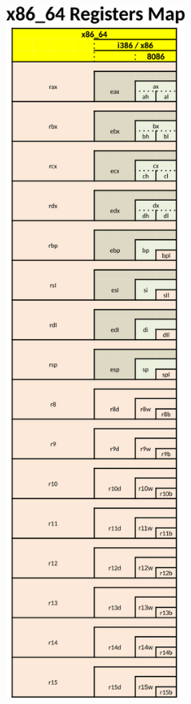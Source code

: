 \documentclass[letterpaper,12pt]{exam}
\begin{document}
\begin{center}
    \includegraphics[height=9in]{../../02_Registers/images/X86_64-GP-registersBIG.png}
    

\end{center}
\end{document}
